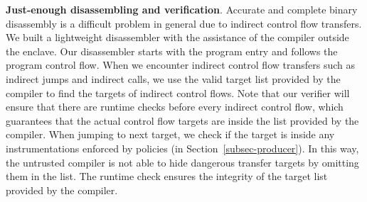 {\vspace{3pt}\noindent\textbf{Just-enough disassembling and verification}.
\label{subsec-disassembling}
Accurate and complete binary disassembly is a difficult problem in general due to indirect control flow transfers. We built a lightweight disassembler with the assistance of the compiler outside the enclave. Our disassembler starts with the program entry and follows the program control flow. When we encounter indirect control flow transfers such as indirect jumps and indirect calls, we use the valid target list provided by the compiler to find the targets of indirect control flows. Note that our verifier will ensure that there are runtime checks before every indirect control flow, which guarantees that the actual control flow targets are inside the list provided by the compiler. 
When jumping to next target, we check if the target is inside any instrumentations enforced by policies (in Section~\ref{subsec-producer}).
In this way, the untrusted compiler is not able to hide dangerous transfer targets by omitting them in the list. The runtime check ensures the integrity of the target list provided by the compiler. 


}








